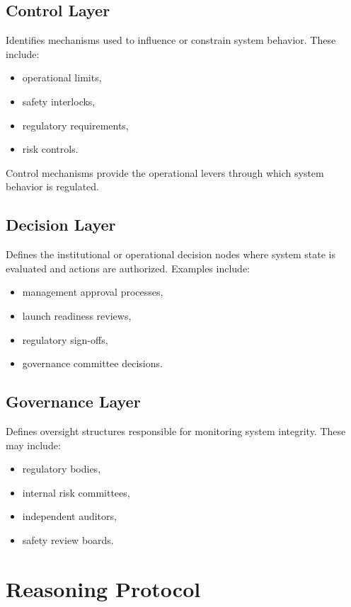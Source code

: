 \subsection{Control Layer}

Identifies mechanisms used to influence or constrain system behavior. These include:

\begin{itemize}
\item operational limits,
\item safety interlocks,
\item regulatory requirements,
\item risk controls.
\end{itemize}

Control mechanisms provide the operational levers through which system behavior is regulated.

\subsection{Decision Layer}

Defines the institutional or operational decision nodes where system state is evaluated and actions are authorized. Examples include:

\begin{itemize}
\item management approval processes,
\item launch readiness reviews,
\item regulatory sign-offs,
\item governance committee decisions.
\end{itemize}

\subsection{Governance Layer}

Defines oversight structures responsible for monitoring system integrity. These may include:

\begin{itemize}
\item regulatory bodies,
\item internal risk committees,
\item independent auditors,
\item safety review boards.
\end{itemize}

\section{Reasoning Protocol}

